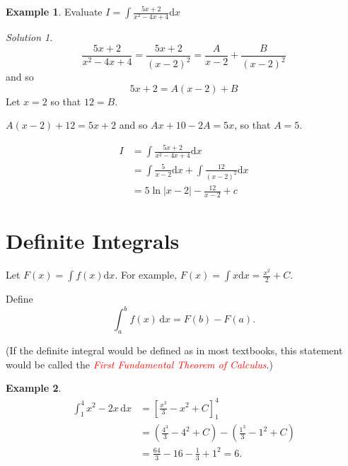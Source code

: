 \documentclass[
  11pt,
  oneside]{book}
\newcommand{\slide}{}
\theoremstyle{definition}
\theoremstyle{definition}
\newtheorem{example}{Example}[chapter]
\theoremstyle{definition}
\theoremstyle{definition}
\theoremstyle{remark}
\newtheorem*{solution}{Solution}
\begin{document}
\begin{slidesonly}

\slide
\phantom{a}

\end{slidesonly}

\slide

\begin{example}
Evaluate \(I = \displaystyle\int\frac{5x+2}{x^2-4x+4} \mathrm{d}x\)
\end{example}

\begin{solution}
\[
\frac{5x+2}{x^2-4x+4} = \frac{5x+2}{(x-2)^2} = \frac A{x-2}+\frac{B}{(x-2)^2}
\]
and so
\[
5x+2 = A(x-2)+B
\]
Let \(x=2\) so that \(12=B\).

\(A(x-2)+12 = 5x+2\) and so \(Ax+10-2A=5x\), so that \(A=5\).

\begin{align*}
I&= \int\frac{5x+2}{x^2-4x+4} \mathrm{d}x\\
&=\int\frac5{x-2}\mathrm{d}x+\int\frac{12}{(x-2)^2}\mathrm{d}x\\
&=5\ln|x-2|-\frac{12}{x-2}+c
\end{align*}
\end{solution}

\begin{slidesonly}

\slide
\phantom{a}

\end{slidesonly}

\slide

\section{Definite Integrals}\label{definite-integrals}

Let \(F(x) = \displaystyle\int f(x)\mathrm{d}x\). For example, \(F(x)=\displaystyle\int x\mathrm{d}x = \frac{x^2}{2} + C\).

Define
\[
\int_a^b f(x)\,\mathrm{d}x = F(b)-F(a).
\]

(If the definite integral would be defined as in most textbooks, this statement would be called the \textcolor{red}{\em First Fundamental Theorem of Calculus}.)

\begin{notslides}

\begin{example}
\begin{align*}
\int_1^4 x^2-2x\,\mathrm{d}x& = \left[\frac{x^3}{3}-x^2+C\right]_1^4\\
&=\left(\frac{4^3}{3}-4^2+C\right) - \left(\frac{1^3}{3}-1^2+C\right)\\
&=\frac{64}{3}-16-\frac{1}{3}+1^2 = 6.
\end{align*}
\end{example}

\end{notslides}
\end{document}
